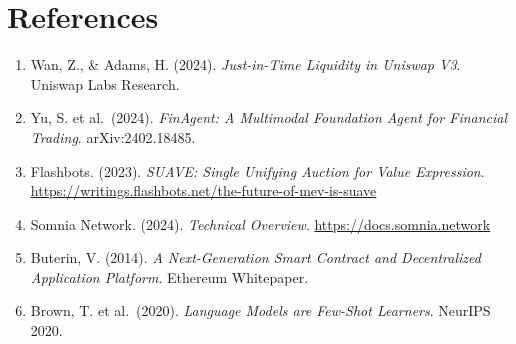 \documentclass[11pt,a4paper]{article}
\begin{document}
\newpage
\section*{References}

\begin{enumerate}[leftmargin=1.8em]
  \item Wan, Z., \& Adams, H. (2024). \textit{Just-in-Time Liquidity in Uniswap V3}. Uniswap Labs Research.
  \item Yu, S. et al.\ (2024). \textit{FinAgent: A Multimodal Foundation Agent for Financial Trading}. arXiv:2402.18485.
  \item Flashbots. (2023). \textit{SUAVE: Single Unifying Auction for Value Expression}.
        \url{https://writings.flashbots.net/the-future-of-mev-is-suave}
  \item Somnia Network. (2024). \textit{Technical Overview}. \url{https://docs.somnia.network}
  \item Buterin, V. (2014). \textit{A Next-Generation Smart Contract and Decentralized Application Platform}. Ethereum Whitepaper.
  \item Brown, T. et al.\ (2020). \textit{Language Models are Few-Shot Learners}. NeurIPS 2020.
\end{enumerate}
\end{document}
